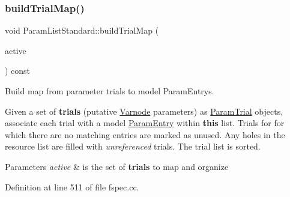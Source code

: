 \subsubsection{\texorpdfstring{buildTrialMap()}{buildTrialMap()}}
{\footnotesize\ttfamily void Param\+List\+Standard\+::build\+Trial\+Map (\begin{DoxyParamCaption}\item[{\mbox{\hyperlink{class_param_active}{Param\+Active}} $\ast$}]{active }\end{DoxyParamCaption}) const\hspace{0.3cm}{\ttfamily [protected]}}



Build map from parameter trials to model Param\+Entrys. 

Given a set of {\bfseries{trials}} (putative \mbox{\hyperlink{class_varnode}{Varnode}} parameters) as \mbox{\hyperlink{class_param_trial}{Param\+Trial}} objects, associate each trial with a model \mbox{\hyperlink{class_param_entry}{Param\+Entry}} within {\bfseries{this}} list. Trials for for which there are no matching entries are marked as unused. Any holes in the resource list are filled with {\itshape unreferenced} trials. The trial list is sorted. 
\begin{DoxyParams}{Parameters}
{\em active} & is the set of {\bfseries{trials}} to map and organize \\
\hline
\end{DoxyParams}


Definition at line 511 of file fspec.\+cc.


